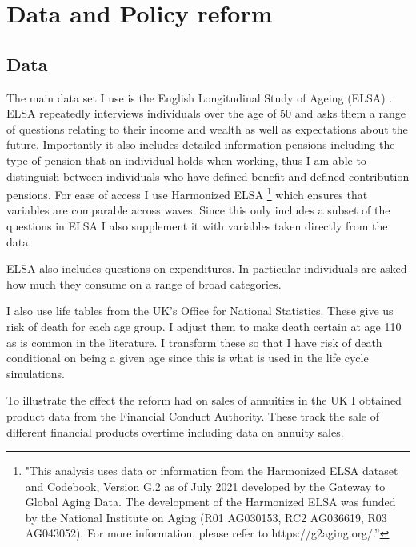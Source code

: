 \documentclass[12pt]{article}
\begin{document}
\section{Data and Policy reform}

\subsection{Data}

The main data set I use is the English Longitudinal Study of Ageing (ELSA) \cite{main_elsa_citation}. ELSA repeatedly interviews
individuals over the age of 50 and asks them a range of questions relating to their income and wealth as well as expectations about
the future. Importantly it also includes detailed information pensions including the type of pension that an individual holds when
working, thus I am able to distinguish between individuals who have defined benefit and defined contribution pensions. For ease of access
I use Harmonized ELSA \footnote{"This analysis uses data or information from the Harmonized ELSA dataset and Codebook, Version G.2 as of
  July 2021 developed by the Gateway to Global Aging Data. The development of the Harmonized ELSA was funded by the National
  Institute on Aging (R01 AG030153, RC2 AG036619, R03 AG043052). For more information,
  please refer to https://g2aging.org/.”} which ensures that variables are comparable across waves. Since this only includes a
subset of the questions in ELSA I also supplement it with variables taken directly from the data.

ELSA also includes questions on expenditures. In particular individuals are asked how much they consume on a range of broad categories.





I also use life tables from the UK's Office for National Statistics. These give us risk of death for each age group. I adjust them
to make death certain at age 110 as is common in the literature. I transform these so that I have risk of death conditional on being
a given age since this is what is used in the life cycle simulations.



To illustrate the effect the reform had on sales of annuities in the UK I obtained product data from the Financial Conduct Authority.
These track the sale of different financial products overtime including data on annuity sales.
\end{document}
